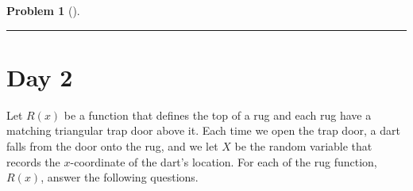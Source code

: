 \documentclass[letterpaper,oneside]{book}%
\theoremstyle{plain}
\theoremstyle{box}
\theoremstyle{problem}
\newtheorem{problemnum}{Problem}[chapter]
\newenvironment{problem}[1][]{\begin{problemnum}[#1]}{\end{problemnum}\nopagebreak\hrule\bigskip}
\begin{document}
\begin{problem}
\begin{enumerate}
 \end{enumerate}
\end{problem}

\section{Day 2}
Let $R(x)$ be a function that defines the top of a rug and each rug have a matching triangular trap door above it. Each time we open the trap door, a dart falls from the door onto the rug, and we let $X$ be the random variable that records the $x$-coordinate of the dart's location. For each of the rug function, $R(x)$, answer the following questions.
\end{document}
